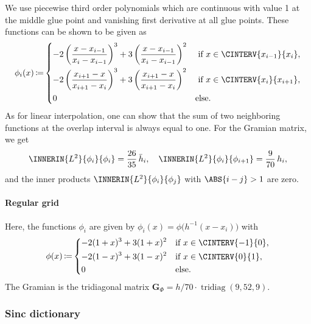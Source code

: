 \documentclass[a4paper]{paper}
\DeclareMathOperator{\TRIDIAG}{{tridiag}}
\DeclareMathOperator{\DEFEQ}{{\coloneqq}}
\newcommand*{\BDG}{\boldsymbol{G}}
\begin{document}
We use piecewise third order polynomials which are continuous with value 1 at the middle glue point and vanishing first 
derivative at all glue points. These functions can be shown to be given as
%
\begin{equation*}
 \phi_i(x) \DEFEQ
 \begin{dcases}
  -2\left( \frac{x - x_{i-1}}{x_i - x_{i-1}} \right)^3 + 
  3 \left( \frac{x - x_{i-1}}{x_i - x_{i-1}} \right)^2 & \text{ if }
  x \in \CINTERV{x_{i-1}}{x_i}, \\
  -2\left( \frac{x_{i+1} - x}{x_{i+1} - x_i} \right)^3 + 
  3 \left( \frac{x_{i+1} - x}{x_{i+1} - x_i} \right)^2 & \text{ if } 
  x \in \CINTERV{x_i}{x_{i+1}}, \\
  0 & \text{else}.
 \end{dcases}
\end{equation*}
%
As for linear interpolation, one can show that the sum of two neighboring functions at the overlap interval is always 
equal to one. For the Gramian matrix, we get
%
\begin{equation*}
 \INNERIN{L^2}{\phi_i}{\phi_i} = \frac{26}{35}\, \bar h_i, 
 \quad
 \INNERIN{L^2}{\phi_i}{\phi_{i+1}} = \frac{9}{70}\, h_i,
\end{equation*}
%
and the inner products $\INNERIN{L^2}{\phi_i}{\phi_j}$ with $\ABS{i-j} > 1$ are zero.

\paragraph{Regular grid}

Here, the functions $\phi_i$ are given by $\phi_i(x) = \phi\big( h^{-1}(x-x_i) \big)$ with
%
\begin{equation*}
 \phi(x) \DEFEQ
 \begin{dcases}
  -2(1+x)^3 + 3(1+x)^2 & \text{if } x \in \CINTERV{-1}{0}, \\
  -2(1-x)^3 + 3(1-x)^2 & \text{if } x \in \CINTERV{0}{1}, \\
  0 & \text{else}.
 \end{dcases}
\end{equation*}
%
The Gramian is the tridiagonal matrix $\BDG_\Phi = h/70\cdot\TRIDIAG(9, 52, 9)$.


\subsubsection{Sinc dictionary}
\label{subsubsec:specif:interp:sinc}
\end{document}
